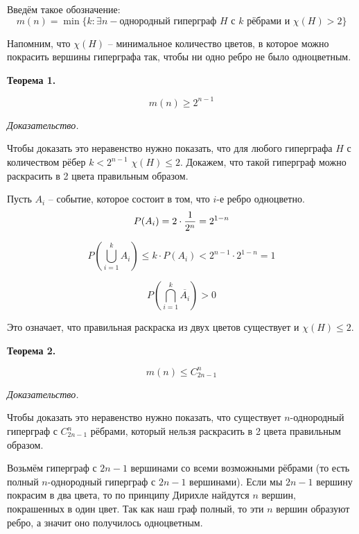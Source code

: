 Введём такое обозначение:
$$
m(n) = \min \{ k : \exists n-\text{однородный гиперграф } H \text{ с } 
k \text{ рёбрами и } \chi(H) > 2 \} 
$$

Напомним, что $\chi(H)$ -- минимальное количество цветов, в которое можно покрасить вершины гиперграфа так, чтобы ни одно ребро не было одноцветным.

\textbf{Теорема 1.}

$$
    m(n) \geqslant 2^{n - 1}
$$

\textit{Доказательство.}

Чтобы доказать это неравенство нужно показать, что для любого гиперграфа $H$ с количеством рёбер $k < 2^{n - 1}$ $\chi(H) \leqslant 2$. Докажем, что такой гиперграф можно раскрасить в 2 цвета правильным образом.

Пусть $A_i$ -- событие, которое состоит в том, что $i$-е ребро одноцветно.
$$
    P(A_i) = 2 \cdot \frac{1}{2^n} = 2^{1 - n} \\
$$

$$
P \left( \bigcup_{i = 1}^{k} A_i \right) \leqslant k \cdot P(A_i) < 
    2^{n - 1} \cdot 2^{1 - n} = 1
$$

$$
P \left( \bigcap_{i = 1}^{k} \overline{A_i} \right) > 0
$$

Это означает, что правильная раскраска из двух цветов существует и $\chi(H) \leqslant 2$.

\textbf{Теорема 2.}

$$
    m(n) \leqslant C_{2n - 1}^{n}
$$

\textit{Доказательство.}

Чтобы доказать это неравенство нужно показать, что существует $n$-однородный гиперграф с
$C_{2n - 1}^{n}$ рёбрами, который нельзя раскрасить в 2 цвета правильным образом.

Возьмём гиперграф с $2n - 1$ вершинами со всеми возможными рёбрами (то есть полный $n$-однородный гиперграф с $2n - 1$ вершинами). Если мы $2n - 1$ вершину покрасим в два цвета, то по принципу Дирихле найдутся $n$ вершин, покрашенных в один цвет. Так как наш граф полный, то эти $n$ вершин образуют ребро, а значит оно получилось одноцветным. 